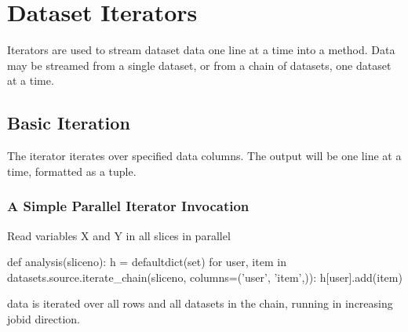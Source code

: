 
\section{Dataset Iterators}

Iterators are used to stream dataset data one line at a time into a
method.  Data may be streamed from a single dataset, or from a chain
of datasets, one dataset at a time.


\subsection{Basic Iteration}

The iterator iterates over specified data columns.  The output will be
one line at a time, formatted as a tuple.

\subsubsection*{A Simple Parallel Iterator Invocation}
Read variables X and Y in all slices in parallel

\begin{python}
def analysis(sliceno):
    h = defaultdict(set)
    for user, item in datasets.source.iterate_chain(sliceno, columns=('user', 'item',)):
        h[user].add(item)
\end{python}
data is iterated over all rows and all datasets in the chain, running
in increasing jobid direction.


